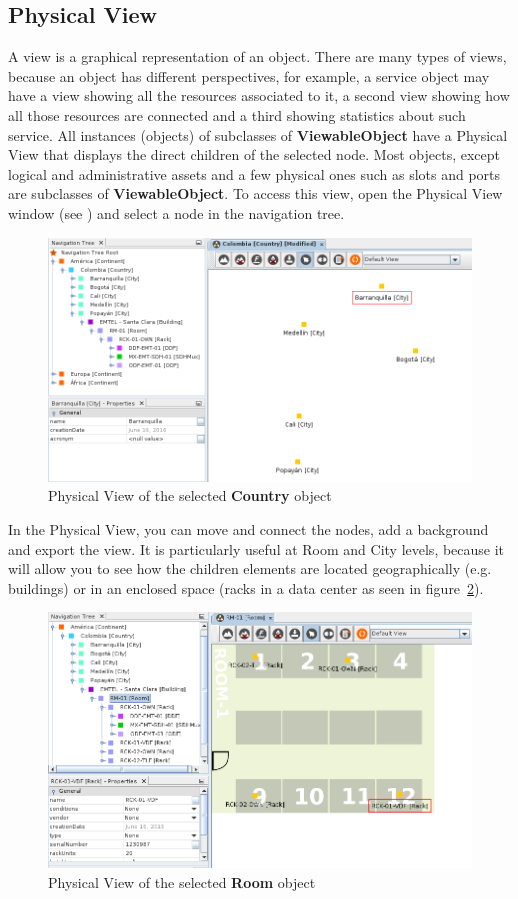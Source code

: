 \documentclass[a4paper]{article}
\begin{document}
	\subsection{Physical View} \label{sec:default_view}
		A view is a graphical representation of an object. There are many types of views, because an object has different perspectives, for example, a service object may have a view showing all the resources associated to it, a second view showing how all those resources are connected and a third showing statistics about such service. All instances (objects) of subclasses of \textbf{ViewableObject} have a Physical View that displays the direct children of the selected node. Most objects, except logical and administrative assets and a few physical ones such as slots and ports are subclasses of \textbf{ViewableObject}. To access this view, open the Physical View window (see ) and select a node in the navigation tree.
		\begin{figure}[h!]
			\centering
			\includegraphics[width=0.9\linewidth]{img/default_view.png}
			\caption{Physical View of the selected \textbf{Country} object}
			\label{fig:default_view}
		\end{figure}
		
		In the Physical View, you can move and connect the nodes, add a background and export the view. It is particularly useful at Room and City levels, because it will allow you to see how the children elements are located geographically (e.g. buildings) or in an enclosed space (racks in a data center as seen in figure~\ref{fig:room_plan}).	
		\begin{figure}[h!]
			\centering
			\includegraphics[width=0.7\linewidth]{img/room_plan.png}
			\caption{Physical View of the selected \textbf{Room} object}
			\label{fig:room_plan}
		\end{figure}
		
\end{document}
